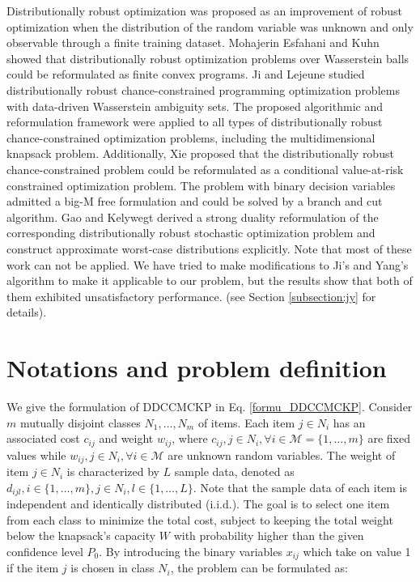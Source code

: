 \documentclass[lettersize,journal]{IEEEtran}
\begin{document}
Distributionally robust optimization was proposed as an improvement of robust optimization when the distribution of the random variable was unknown and only observable through a finite training dataset.
Mohajerin Esfahani and Kuhn \cite{mohajerin2018data} showed that distributionally robust optimization problems over Wasserstein balls could be reformulated as finite convex programs. 
Ji and Lejeune \cite{ji2021data} studied distributionally robust chance-constrained programming optimization problems with data-driven Wasserstein ambiguity sets. 
The proposed algorithmic and reformulation framework were applied to all types of distributionally robust chance-constrained optimization problems, including the multidimensional knapsack problem.
Additionally, Xie \cite{xie2021distributionally} proposed that the distributionally robust chance-constrained problem could be reformulated as a conditional value-at-risk constrained optimization problem. 
The problem with binary decision variables admitted a big-M free formulation and could be solved by a branch and cut algorithm. 
Gao and Kelywegt \cite{gao2022distributionally} derived a strong duality reformulation of the corresponding distributionally robust stochastic optimization problem and construct approximate worst-case distributions explicitly. 
Note that most of these work can not be applied. 
We have tried to make modifications to Ji’s \cite{ji2021data} and Yang's \cite{yang2018algorithm} algorithm to make it applicable to our problem, but the results show that both of them exhibited unsatisfactory performance. (see Section \ref{subsection:jy} for details).

\section{Notations and problem definition}
\label{section:np}
We give the formulation of DDCCMCKP in Eq. \ref{formu_DDCCMCKP}. 
Consider $m$ mutually disjoint classes $N_1,\ldots,N_m$ of items. 
Each item $j\in N_i$ has an associated cost $c_{ij}$ and weight $w_{ij}$, where $c_{ij}, j\in N_i, \forall i\in \mathcal{M}=\{1,\ldots,m\}$ are fixed values while $w_{ij},j\in N_i,\forall i\in \mathcal{M}$ are unknown random variables. 
The weight of item $j\in N_i$ is characterized by $L$ sample data, denoted as $d_{ijl},i\in \{1,\ldots,m\},j\in N_i, l\in \{1,\ldots,L\}$.
Note that the sample data of each item is independent and identically distributed (i.i.d.).
The goal is to select one item from each class to minimize the total cost, subject to keeping the total weight below the knapsack’s capacity $W$ with probability higher than the given confidence level $P_0$.
By introducing the binary variables $x_{ij}$ which take on value 1 if the item $j$ is chosen in class $N_i$, the problem can be formulated as:
\end{document}
